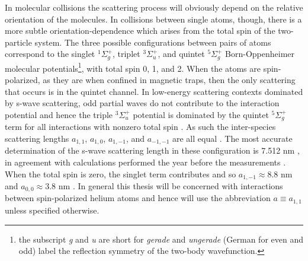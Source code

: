 	In molecular collisions the scattering process will obviously depend on the relative orientation of the molecules.
	In collisions between single atoms, though, there is a more subtle orientation-dependence which arises from the total spin of the two-particle system.
	The three possible configurations between pairs of \mhe atoms correspond to the singlet $^1\Sigma_g^+$, triplet $^3\Sigma_u^+$, and quintet $^5\Sigma_g^+$ Born-Oppenheimer molecular potentials\footnote{the subscript \emph{g} and \emph{u} are short for \emph{gerade} and \emph{ungerade} (German for even and odd) label the reflection symmetry of the two-body wavefunction.}, with total spin 0, 1, and 2.
	When the atoms are spin-polarized, as they are when confined in magnetic traps, then the only scattering that occurs is in the quintet channel.
	In low-energy scattering contexts dominated by s-wave scattering, odd partial waves do not contribute to the interaction potential and hence the triple $^3\Sigma_u^+$ potential is dominated by the quintet $^5\Sigma_g^+$ term for all interactions with nonzero total spin \cite{Leo01}. 
	As such the inter-species scattering lengths $a_{1,1}$, $a_{1,0}$, $a_{1,-1}$, and $a_{-1,-1}$ are all equal \cite{Leo01,Vassen16}.
	The most accurate determination of the s-wave scattering length in these configuration is 7.512 nm \cite{Moal06}, in agreement with calculations performed the year before the measurements \cite{Przybytek05}.
	When the total spin is zero, the singlet term contributes and so $a_{1,-1}\approx8.8$ nm and $a_{0,0}\approx3.8$ nm \cite{Leo01,Vassen16}.
	In general this thesis will be concerned with interactions between spin-polarized helium atoms and hence will use the abbreviation $a\equiv a_{1,1}$ unless specified otherwise.
	
